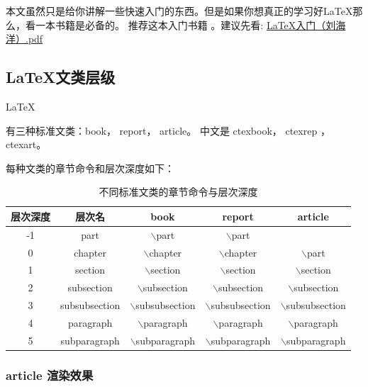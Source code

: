 \documentclass[UTF8,AutoFakeBold]{ctexart}
\numberwithin{figure}{section}
\numberwithin{table}{section}
\begin{document}
本文虽然只是给你讲解一些快速入门的东西。但是如果你想真正的学习好\LaTeX 那么，看一本书籍是必备的。
推荐这本入门书籍\cite{latex_start} 。建议先看: \href{https://github.com/heartacker/MyNotes/blob/master/01.Latex/LaTeX_Docs_2014/04%20%E7%94%B5%E5%AD%90%E4%B9%A6/LaTeX%E5%85%A5%E9%97%A8%EF%BC%88%E5%88%98%E6%B5%B7%E6%B4%8B%EF%BC%89.pdf}{LaTeX入门（刘海洋）.pdf}


\subsection{\LaTeX 文类层级}
\label{sec:structure}
\hypertarget{Levelofdepth}{\LaTeX} 有三种标准文类：book， report， article。 中文是 ctexbook， ctexrep ， ctexart。

每种文类的章节命令和层次深度如下：


\begin{table}[htbp]
    \centering
    \begin{tabular}{|c|c|c|c|c|}
        \hline
        层次深度 & 层次名        & book                      & report                    & article                   \\
        \hline
        -1       & part          & $\backslash$part          & $\backslash$part          &                           \\
        \hline
        0        & chapter       & $\backslash$chapter       & $\backslash$chapter       & $\backslash$part          \\
        1        & section       & $\backslash$section       & $\backslash$section       & $\backslash$section       \\
        2        & subsection    & $\backslash$subsection    & $\backslash$subsection    & $\backslash$subsection    \\
        3        & subsubsection & $\backslash$subsubsection & $\backslash$subsubsection & $\backslash$subsubsection \\
        4        & paragraph     & $\backslash$paragraph     & $\backslash$paragraph     & $\backslash$paragraph     \\
        5        & subparagraph  & $\backslash$subparagraph  & $\backslash$subparagraph  & $\backslash$subparagraph  \\
        \hline
    \end{tabular}
    \caption{不同标准文类的章节命令与层次深度}
    \label{tab:typeoflatex}
\end{table}


\subsubsection{article 渲染效果}
\end{document}
